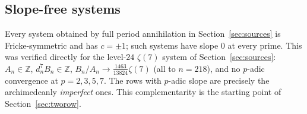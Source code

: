 \subsection{Slope-free systems}

Every system obtained by full period annihilation in Section~\ref{sec:sources} is Fricke-symmetric and has $c=\pm1$; such systems have slope $0$ at every prime. This was verified directly for the level-$24$ $\zeta(7)$ system of Section~\ref{sec:sources}: $A_n\in\mathbb Z$, $d_n^7B_n\in\mathbb Z$, $B_n/A_n\to\tfrac{1463}{13824}\zeta(7)$ (all to $n=218$), and no $p$-adic convergence at $p=2,3,5,7$. The rows with $p$-adic slope are precisely the archimedeanly \emph{imperfect} ones. This complementarity is the starting point of Section~\ref{sec:tworow}.



